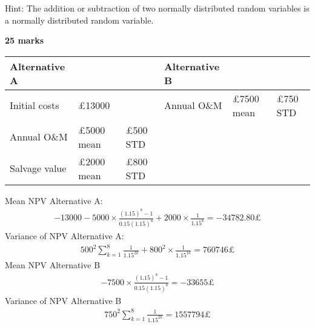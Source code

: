 Hint: The addition or subtraction of two normally distributed random variables is a normally distributed random variable.

\textbf{25 marks}

\begin{table}[H]
    \centering
    \begin{tabular}{@{}llllll@{}}
        \toprule
        Alternative A &                   &                 & Alternative B &                   &                 \\
        \midrule
        Initial costs & \pounds 13000     &                 & Annual O\&M   & \pounds 7500 mean & \pounds 750 STD \\
        Annual O\&M   & \pounds 5000 mean & \pounds 500 STD &               &                   &                 \\
        Salvage value & \pounds 2000 mean & \pounds 800 STD &               &                   &                 \\
        \bottomrule
    \end{tabular}
\end{table}
Mean NPV Alternative A:
\begin{gather}
    -13000 - 5000\times \frac{\left(1.15\right)^8 - 1}{0.15\left(1.15\right)^8} + 2000\times \frac{1}{1.15^8} = -34782.80 \pounds
\end{gather}
Variance of NPV Alternative A:
\begin{gather}
    500^2 \sum_{k=1}^8 \frac{1}{1.15^{2k}} + 800^2 \times \frac{1}{1.15^16} = 760746\pounds
\end{gather}
Mean NPV Alternative B
\begin{gather}
    -7500\times \frac{\left(1.15\right)^8 - 1}{0.15\left(1.15\right)^8} = -33655\pounds
\end{gather}
Variance of NPV Alternative B
\begin{gather}
    750^2\sum_{k=1}^8 \frac{1}{1.15^{2k}} = 1557794\pounds
\end{gather}